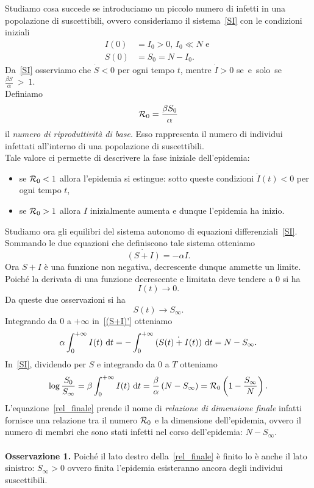 Studiamo cosa succede se introduciamo un piccolo numero di infetti in una popolazione di suscettibili, ovvero consideriamo il sistema~\eqref{SI} con le condizioni iniziali
\begin{equation*}
\begin{aligned}
  I(0)&=I_0>0 ,\, I_0 \ll N \text{ e } \\
  S(0)&=S_0= N-I_0.
\end{aligned}
\end{equation*}
Da~\eqref{SI} osserviamo che $\dot S<0$ per ogni tempo $t$,  mentre $\dot I>0$ se~e~solo~se~$\frac{\beta S }{\alpha}~>~1 $.\\
Definiamo  
$$ \mathcal R_0  = \frac{\beta S_0 }{\alpha}$$ 
il \textit{numero  di riproduttivit\`a di base}. Esso  rappresenta il numero di individui infettati all'interno di una popolazione di suscettibili.\\
Tale valore ci permette di descrivere la fase iniziale dell'epidemia:
\begin{itemize}
	\item se $\mathcal R_0<1$ allora l'epidemia si estingue: sotto queste condizioni $\dot I(t)<0$ per ogni tempo $t$,
	\item se $\mathcal R_0>1$ allora $I$ inizialmente aumenta e dunque l'epidemia ha inizio.
\end{itemize}
Studiamo ora  gli equilibri del sistema autonomo di equazioni differenziali~\eqref{SI}.\\
Sommando le due equazioni  che definiscono tale  sistema otteniamo 
\begin{equation}
	\label{(S+I)'}\dot{(S+I)} = -\alpha I.
\end{equation}
Ora $S+I$ \`e una funzione non negativa, decrescente dunque ammette un limite.\\
Poich\'e la derivata di una funzione decrescente e limitata deve tendere a $0$ si ha $$I(t)\to 0.$$
Da queste due osservazioni si ha $$S(t) \to S_\infty. $$ 
Integrando  da $0$ a $+\infty$ in~\eqref{(S+I)'} otteniamo 
$$ \alpha \int_0^{+\infty} I(t) \,\,\mathrm{d} t = -\int_0^{+\infty} \dot{\left(  S(t) + I(t) \right)} \,\,\mathrm{d} t= N -S_\infty.$$ 
In~\eqref{SI}, dividendo per $S$ e integrando da $0$ a $T$ otteniamo 
\begin{equation}\label{rel_finale} \log \frac{S_0}{S_\infty} = \beta \int_0^{+\infty} I(t) \,\,\mathrm{d} t =  \frac{\beta}{\alpha} \left(  N - S_\infty  \right)= \mathcal R_0 \left(  1 - \frac{S_\infty}{N} \right).
\end{equation}
L'equazione~\eqref{rel_finale} prende il nome di \textit{relazione di dimensione finale} infatti fornisce una relazione tra il numero $\mathcal R_0$ e la dimensione dell'epidemia,  ovvero il numero di membri che sono stati infetti nel corso dell'epidemia: $ N-S_\infty$.\\ \\
\textbf{Osservazione 1.} Poich\'e il lato destro della~\eqref{rel_finale} \`e finito lo \`e anche il lato sinistro:  $S_\infty >0$ ovvero finita l'epidemia esisteranno ancora degli individui suscettibili.	


